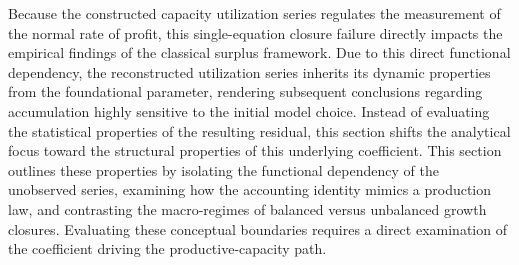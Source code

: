 \documentclass[11pt]{article}
\begin{document}
Because the constructed capacity utilization series regulates the measurement of the normal rate of profit, this single-equation closure failure directly impacts the empirical findings of the classical surplus framework. Due to this direct functional dependency, the reconstructed utilization series inherits its dynamic properties from the foundational parameter, rendering subsequent conclusions regarding accumulation highly sensitive to the initial model choice. Instead of evaluating the statistical properties of the resulting residual, this section shifts the analytical focus toward the structural properties of this underlying coefficient. This section outlines these properties by isolating the functional dependency of the unobserved series, examining how the accounting identity mimics a production law, and contrasting the macro-regimes of balanced versus unbalanced growth closures. Evaluating these conceptual boundaries requires a direct examination of the coefficient driving the productive-capacity path.
\end{document}
